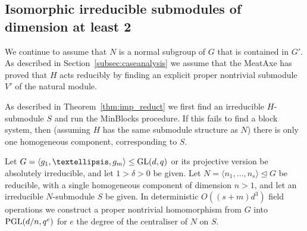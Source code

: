 \subsection{Isomorphic irreducible submodules of dimension at least 2} 
\label{subsec:tensor}

We continue to assume that $N$ is a normal subgroup of $G$ that is
contained in $G'$. As described in
Section~\ref{subsec:caseanalysis} we assume that the
MeatAxe has proved that $H$ acts reducibly by finding an explicit
proper nontrivial submodule $V'$ of the natural module.

As described in Theorem~\ref{thm:imp_reduct} we first find an
irreducible $H$-submodule $S$ and run the {\sc MinBlocks} procedure. If
this fails to find a block system, then (assuming $H$ has the same
submodule structure as $N$) there is only one homogeneous component,
corresponding to $S$.

\begin{Theo} 
Let  $G = \langle g_1, \ldots, g_m \rangle \leq \GL(d, q)$ or its
projective version be absolutely irreducible, and let $1 > \delta > 0$ be given.
Let $N = \langle n_1, \ldots, n_s \rangle  \unlhd G$ be reducible, with a single homogeneous component of dimension $n > 1$, and let an irreducible $N$-submodule $S$ be given.
In deterministic $O((s+m)d^3)$ field operations we construct a proper nontrivial 
homomorphism from $G$ into $\PGL(d/n, q^e)$ for $e$ the degree of 
the centraliser of $N$ on $S$. 
\end{Theo}

